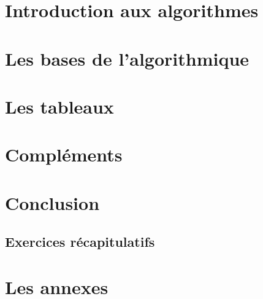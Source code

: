 \documentclass[a4paper,doubleside]{book}
\begin{document}

	
	
	

	\part{Introduction aux algorithmes}	
		
		
		

	\part{Les bases de l'algorithmique}
		
		
		
		
		

	\part{Les tableaux}
		
		
		
		
			
	\part{Compléments}
		
		

	\part{Conclusion}
		\chapter{Exercices récapitulatifs}

	\appendix
	
	\part{Les annexes}
		
		
	
	
\end{document}
